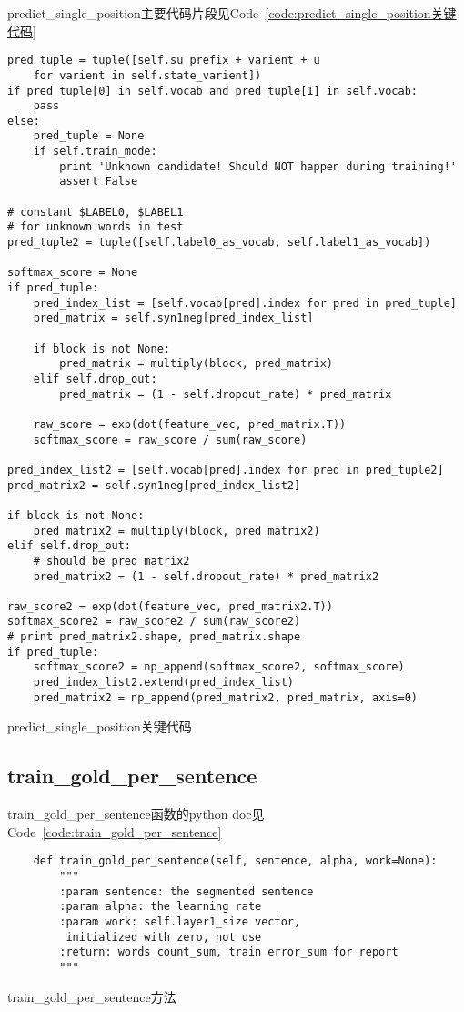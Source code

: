 \documentclass[]{article}
\begin{document}
predict\_single\_position主要代码片段见Code~\ref{code:predict_single_position关键代码}
\begin{listing}[H]
\begin{verbatim}
pred_tuple = tuple([self.su_prefix + varient + u
    for varient in self.state_varient])
if pred_tuple[0] in self.vocab and pred_tuple[1] in self.vocab:
    pass
else:
    pred_tuple = None
    if self.train_mode:
        print 'Unknown candidate! Should NOT happen during training!'
        assert False

# constant $LABEL0, $LABEL1
# for unknown words in test
pred_tuple2 = tuple([self.label0_as_vocab, self.label1_as_vocab])

softmax_score = None
if pred_tuple:
    pred_index_list = [self.vocab[pred].index for pred in pred_tuple]
    pred_matrix = self.syn1neg[pred_index_list]

    if block is not None:
        pred_matrix = multiply(block, pred_matrix)
    elif self.drop_out:
        pred_matrix = (1 - self.dropout_rate) * pred_matrix

    raw_score = exp(dot(feature_vec, pred_matrix.T))
    softmax_score = raw_score / sum(raw_score)

pred_index_list2 = [self.vocab[pred].index for pred in pred_tuple2]
pred_matrix2 = self.syn1neg[pred_index_list2]

if block is not None:
    pred_matrix2 = multiply(block, pred_matrix2)
elif self.drop_out:
    # should be pred_matrix2
    pred_matrix2 = (1 - self.dropout_rate) * pred_matrix2

raw_score2 = exp(dot(feature_vec, pred_matrix2.T))
softmax_score2 = raw_score2 / sum(raw_score2)
# print pred_matrix2.shape, pred_matrix.shape
if pred_tuple:
    softmax_score2 = np_append(softmax_score2, softmax_score)
    pred_index_list2.extend(pred_index_list)
    pred_matrix2 = np_append(pred_matrix2, pred_matrix, axis=0)
\end{verbatim}
\caption{predict\_single\_position关键代码}
\label{code:predict_single_position关键代码}
\end{listing}

\subsection{train\_gold\_per\_sentence}

train\_gold\_per\_sentence函数的python doc见Code~\ref{code:train_gold_per_sentence}
\begin{listing}[H]
\begin{verbatim}
    def train_gold_per_sentence(self, sentence, alpha, work=None):
        """
        :param sentence: the segmented sentence
        :param alpha: the learning rate
        :param work: self.layer1_size vector,
         initialized with zero, not use
        :return: words count_sum, train error_sum for report
        """
\end{verbatim}
\caption{train\_gold\_per\_sentence方法}
\label{code:train_gold_per_sentence}
\end{listing}
\end{document}

